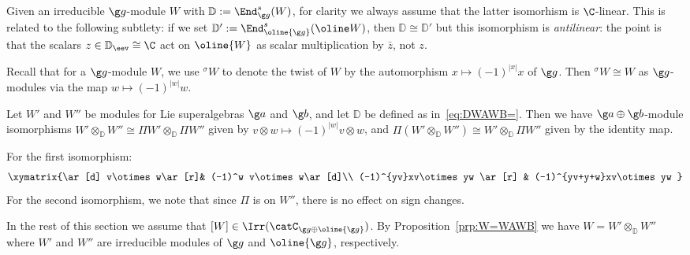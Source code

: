 \documentclass[12pt]{amsart}
\begin{document}
 
\begin{details}
Given an irreducible $\g g$-module $W$ with $\mathbb D:=\End_{\g g}^s(W)$, for clarity we always assume that the latter isomorhism is $\C$-linear. This is related to the following subtlety: if we set $\mathbb D':=\End_{\oline{\g g}}^s(\oline W) $, then $\mathbb D\cong \mathbb D'$ but this isomorphism is \emph{antilinear}: the point is that the scalars $z\in \mathbb D_\eev\cong \C$ act on $\oline{W}$ as scalar multiplication by $\bar z$, not $z$. 
\end{details}

\begin{rmk}
\label{rmk:(-1)|x|isom}Recall that for a $\g g$-module $W$, we use $^\sigma W$ to denote the twist of $W$ by the automorphism $x\mapsto (-1)^{|x|} x$ of $\g g$. Then  $^\sigma W\cong W$ as $\g g$-modules via the map $w\mapsto (-1)^{|w|}w$.
\end{rmk}
\begin{rmk}
\label{rmk:PiWW}Let $W'$ and $W''$ be modules for Lie superalgebras $\g a$ and $\g b$, and let $\mathbb D$ be defined as in~\eqref{eq:DWAWB=}. Then we have  $\g a\oplus\g b$-module isomorphisms
$W'\otimes_\mathbb D W''\cong \Pi W'\otimes_\mathbb D\Pi W''$ given by $v\otimes w\mapsto (-1)^{|w|}v\otimes w$, and  $\Pi(W'\otimes_{\mathbb D} W'') \cong W'\otimes_{\mathbb D} \Pi W''$ given by the identity map. 
\end{rmk}

\begin{details}
For the first isomorphism:\[
\xymatrix{\ar[d] v\otimes w\ar[r]& 
 (-1)^w v\otimes w\ar[d]\\
(-1)^{yv}xv\otimes yw \ar[r] & (-1)^{yv+y+w}xv\otimes yw 
 }
\]
For the second isomorphism, we note that since $\Pi$ is on $W''$, there is no effect on sign changes. 
\end{details}

In the rest of this section we assume that $[W]\in\Irr(\catC_{\g g\oplus\oline{\g g}})$.  By Proposition~\ref{prp:W=WAWB} we have  $W= W'\otimes_{\mathbb D}W''$ where $W'$ and $W''$ are irreducible modules of $\g g$ and $\oline{\g g}$, respectively. 
\end{document}
